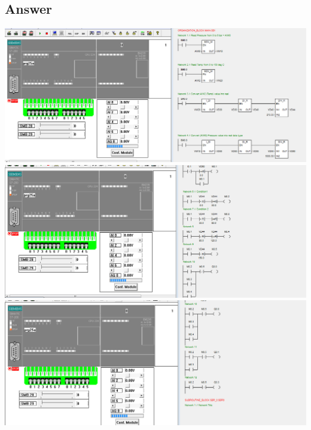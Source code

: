 \documentclass[
	12pt, %
]{fphw}
\begin{document}
\subsection*{Answer}
  \begin{center}
  \includegraphics[width = 165mm, scale =0.9]{prg25a.png}
  \includegraphics[width = 165mm, scale =0.9]{prg25b.png}
  \includegraphics[width = 165mm, scale =0.9]{prg25c.png}
  \end{center}
\end{document}
